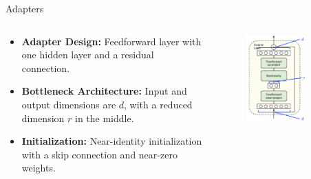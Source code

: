 \documentclass[serif, aspectratio=169]{beamer}
\begin{document}
\begin{frame}{Adapters}
    \begin{columns} %

        \begin{column}{0.5\textwidth}
            \begin{itemize}
                \item  
                    \textbf{Adapter Design: }
                     Feedforward layer with one hidden layer and a residual connection.
                    \vspace{0.3cm}
                \item  
                    \textbf{Bottleneck Architecture: }
                     Input and output dimensions are $d$, with a reduced dimension $r$ in the middle.
                    \vspace{0.3cm}
                \item  
                    \textbf{Initialization: }
                     Near-identity initialization with a skip connection and near-zero weights.
                    \vspace{0.3cm}
            \end{itemize}
        \end{column}

        \begin{column}{0.5\textwidth}
            \begin{figure}
                \centering
                \includegraphics[width=0.75\textwidth, height=0.85\textheight]{pic/Adaptor 2.PNG}
            \end{figure}
        \end{column}

    \end{columns}
\end{frame}
\end{document}
